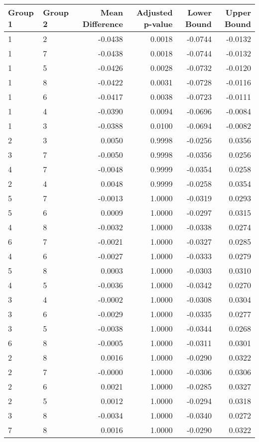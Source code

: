 \begin{tabular}{llrrrr}
\toprule
Group 1 & Group 2 & Mean Difference & Adjusted p-value & Lower Bound & Upper Bound \\
\midrule
1 & 2 & -0.0438 & 0.0018 & -0.0744 & -0.0132 \\
1 & 7 & -0.0438 & 0.0018 & -0.0744 & -0.0132 \\
1 & 5 & -0.0426 & 0.0028 & -0.0732 & -0.0120 \\
1 & 8 & -0.0422 & 0.0031 & -0.0728 & -0.0116 \\
1 & 6 & -0.0417 & 0.0038 & -0.0723 & -0.0111 \\
1 & 4 & -0.0390 & 0.0094 & -0.0696 & -0.0084 \\
1 & 3 & -0.0388 & 0.0100 & -0.0694 & -0.0082 \\
2 & 3 & 0.0050 & 0.9998 & -0.0256 & 0.0356 \\
3 & 7 & -0.0050 & 0.9998 & -0.0356 & 0.0256 \\
4 & 7 & -0.0048 & 0.9999 & -0.0354 & 0.0258 \\
2 & 4 & 0.0048 & 0.9999 & -0.0258 & 0.0354 \\
5 & 7 & -0.0013 & 1.0000 & -0.0319 & 0.0293 \\
5 & 6 & 0.0009 & 1.0000 & -0.0297 & 0.0315 \\
4 & 8 & -0.0032 & 1.0000 & -0.0338 & 0.0274 \\
6 & 7 & -0.0021 & 1.0000 & -0.0327 & 0.0285 \\
4 & 6 & -0.0027 & 1.0000 & -0.0333 & 0.0279 \\
5 & 8 & 0.0003 & 1.0000 & -0.0303 & 0.0310 \\
4 & 5 & -0.0036 & 1.0000 & -0.0342 & 0.0270 \\
3 & 4 & -0.0002 & 1.0000 & -0.0308 & 0.0304 \\
3 & 6 & -0.0029 & 1.0000 & -0.0335 & 0.0277 \\
3 & 5 & -0.0038 & 1.0000 & -0.0344 & 0.0268 \\
6 & 8 & -0.0005 & 1.0000 & -0.0311 & 0.0301 \\
2 & 8 & 0.0016 & 1.0000 & -0.0290 & 0.0322 \\
2 & 7 & -0.0000 & 1.0000 & -0.0306 & 0.0306 \\
2 & 6 & 0.0021 & 1.0000 & -0.0285 & 0.0327 \\
2 & 5 & 0.0012 & 1.0000 & -0.0294 & 0.0318 \\
3 & 8 & -0.0034 & 1.0000 & -0.0340 & 0.0272 \\
7 & 8 & 0.0016 & 1.0000 & -0.0290 & 0.0322 \\
\bottomrule
\end{tabular}

